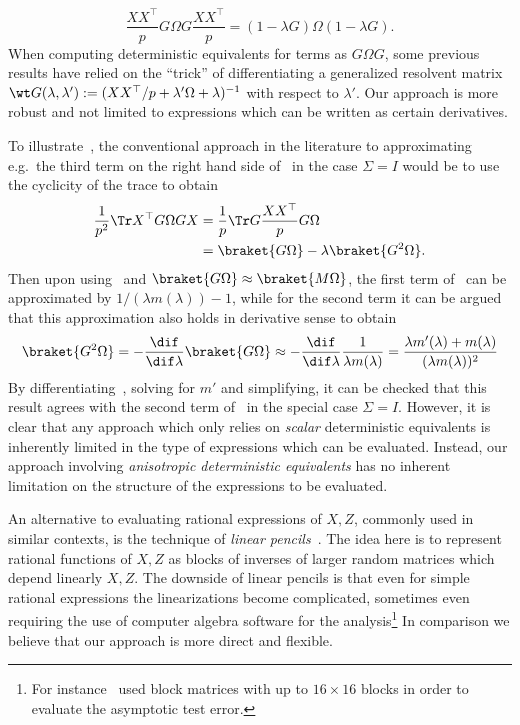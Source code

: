 \begin{equation}
    \frac{XX^\top}{p} G\Omega G \frac{XX^\top}{p} = (1-\lambda G)\Omega(1-\lambda G).
\end{equation}
When computing deterministic equivalents for terms as $G\Omega G$, some previous results have relied on the ``trick'' of differentiating a generalized resolvent matrix $\wt G(\lambda,\lambda'):=(XX^\top/p + \lambda'\Omega + \lambda)^{-1}$ with respect to $\lambda'$. Our approach is more robust and not limited to expressions which can be written as certain derivatives. 

To illustrate~, the conventional approach in the literature to approximating e.g.\ the third term on the right hand side of~ in the case $\Sigma=I$ would be to use the cyclicity of the trace to obtain
\begin{equation}\label{old approach}
    \begin{split}
        \frac{1}{p^2}\Tr X^\top G\Omega G X &= \frac{1}{p}\Tr G \frac{X X^\top}{p} G\Omega \\
        &= \braket{ G\Omega} -\lambda \braket{G^2\Omega}.
    \end{split}
\end{equation}
Then upon using~ and $\braket{G\Omega}\approx\braket{M\Omega}$, the first term of~ can be approximated by $1/(\lambda m(\lambda))-1$, while for the second term it can be argued that this approximation  also holds in derivative sense to obtain
\[\braket{G^2 \Omega}=-\frac{\dif}{\dif\lambda}\braket{G\Omega} \approx -\frac{\dif}{\dif\lambda} \frac{1}{\lambda m(\lambda)} = \frac{\lambda m'(\lambda)+m(\lambda)}{(\lambda m(\lambda))^2}
\]
By differentiating~, solving for $m'$ and simplifying, it can be checked that this result agrees with the second term of~ in the special case $\Sigma=I$. However, it is clear that any approach which only relies on \emph{scalar} deterministic equivalents is inherently limited in the type of expressions which can be evaluated. Instead, our approach involving \emph{anisotropic deterministic equivalents} has no inherent limitation on the structure of the expressions to be evaluated.

An alternative to evaluating rational expressions of $X,Z$, commonly used in similar contexts, is the technique of \emph{linear pencils}~\cite{2008.06786, 2312.09194}. The idea here is to represent rational functions of $X,Z$ as blocks of inverses of larger random matrices which depend linearly $X,Z$. The downside of linear pencils is that even for simple rational expressions the linearizations become complicated, sometimes even requiring the use of computer algebra software for the analysis\footnote{For instance~\cite{2008.06786} used block matrices with up to $16\times 16$ blocks in order to evaluate the asymptotic test error.} In comparison we believe that our approach is more direct and flexible.

